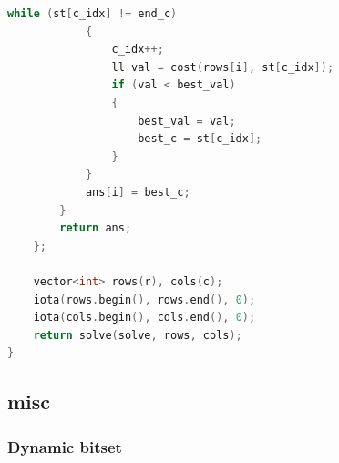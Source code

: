 \documentclass[10pt,landscape,a4paper,twocolumn]{article}
\begin{document}
\begin{lstlisting}[language=C++]
            while (st[c_idx] != end_c)
            {
                c_idx++;
                ll val = cost(rows[i], st[c_idx]);
                if (val < best_val)
                {
                    best_val = val;
                    best_c = st[c_idx];
                }
            }
            ans[i] = best_c;
        }
        return ans;
    };

    vector<int> rows(r), cols(c);
    iota(rows.begin(), rows.end(), 0);
    iota(cols.begin(), cols.end(), 0);
    return solve(solve, rows, cols);
}
\end{lstlisting}
\subsection{misc}
\subsubsection{Dynamic bitset}
\end{document}

